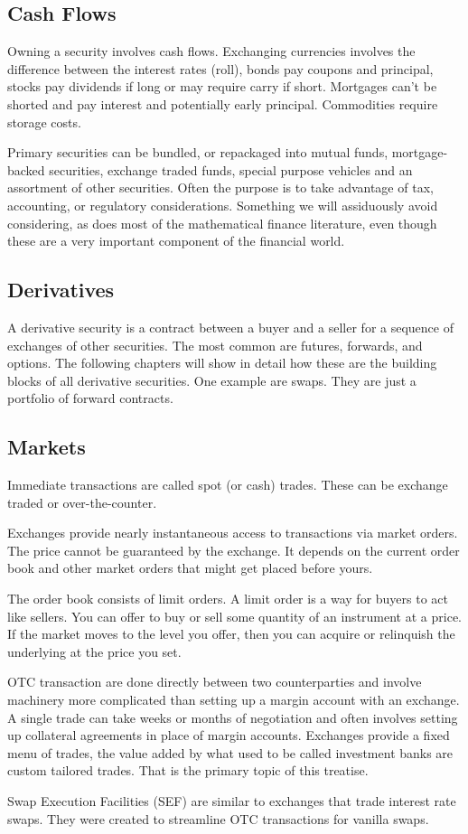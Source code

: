 \documentclass[]{article}
\begin{document}
\subsection{Cash Flows}\label{cash-flows}

Owning a security involves cash flows. Exchanging currencies involves
the difference between the interest rates (roll), bonds pay coupons and
principal, stocks pay dividends if long or may require carry if short.
Mortgages can't be shorted and pay interest and potentially early
principal. Commodities require storage costs.

Primary securities can be bundled, or repackaged into mutual funds,
mortgage-backed securities, exchange traded funds, special purpose
vehicles and an assortment of other securities. Often the purpose is to
take advantage of tax, accounting, or regulatory considerations.
Something we will assiduously avoid considering, as does most of the
mathematical finance literature, even though these are a very important
component of the financial world.

\subsection{Derivatives}\label{derivatives}

A derivative security is a contract between a buyer and a seller for a
sequence of exchanges of other securities. The most common are futures,
forwards, and options. The following chapters will show in detail how
these are the building blocks of all derivative securities. One example
are swaps. They are just a portfolio of forward contracts.

\subsection{Markets}\label{markets}

Immediate transactions are called spot (or cash) trades. These can be
exchange traded or over-the-counter.

Exchanges provide nearly instantaneous access to transactions via market
orders. The price cannot be guaranteed by the exchange. It depends on
the current order book and other market orders that might get placed
before yours.

The order book consists of limit orders. A limit order is a way for
buyers to act like sellers. You can offer to buy or sell some quantity
of an instrument at a price. If the market moves to the level you offer,
then you can acquire or relinquish the underlying at the price you set.

OTC transaction are done directly between two counterparties and involve
machinery more complicated than setting up a margin account with an
exchange. A single trade can take weeks or months of negotiation and
often involves setting up collateral agreements in place of margin
accounts. Exchanges provide a fixed menu of trades, the value added by
what used to be called investment banks are custom tailored trades. That
is the primary topic of this treatise.

Swap Execution Facilities (SEF) are similar to exchanges that trade
interest rate swaps. They were created to streamline OTC transactions
for vanilla swaps.
\end{document}
